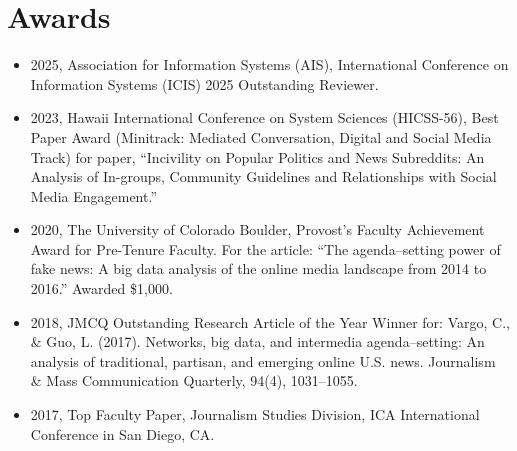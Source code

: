 \documentclass[11pt,letterpaper]{article}
\begin{document}
\section{Awards}
\begin{itemize}
\item 2025, Association for Information Systems (AIS), International Conference on Information Systems (ICIS) 2025 Outstanding Reviewer.
\item 2023, Hawaii International Conference on System Sciences (HICSS-56), Best Paper Award (Minitrack: Mediated Conversation, Digital and Social Media Track) for paper, ``Incivility on Popular Politics and News Subreddits: An Analysis of In-groups, Community Guidelines and Relationships with Social Media Engagement.''
\item 2020, The University of Colorado Boulder, Provost's Faculty Achievement Award for Pre-Tenure Faculty. For the article: ``The agenda--setting power of fake news: A big data analysis of the online media landscape from 2014 to 2016.'' Awarded \$1,000.
\item 2018, JMCQ Outstanding Research Article of the Year Winner for: Vargo, C., \& Guo, L. (2017). Networks, big data, and intermedia agenda--setting: An analysis of traditional, partisan, and emerging online U.S. news. Journalism \& Mass Communication Quarterly, 94(4), 1031--1055.
\item 2017, Top Faculty Paper, Journalism Studies Division, ICA International Conference in San Diego, CA.
\end{itemize}
\end{document}
